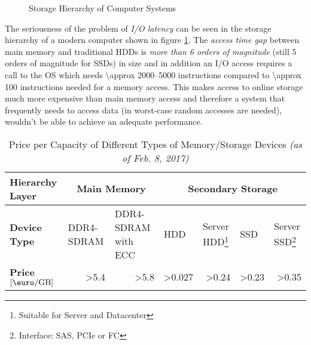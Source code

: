 \begin{@empty}
\begin{figure}[ht!]
\begin{minipage}{\linewidth}
{
		}
		\end{minipage}
		\caption{Storage Hierarchy of Computer Systems} \label{fig:storagehierarchy}
		\protect
	\end{figure}
\end{@empty}
	
	The seriousness of the problem of \emph{I/O latency} can be seen in the storage hierarchy of a modern computer shown in figure \ref{fig:storagehierarchy}. The \emph{access time gap} between main memory and traditional HDDs is \emph{more than 6 orders of magnitude} (still 5 orders of magnitude for SSDs) in size and in addition an I/O access requires a call to the OS which needs \numrange{\approx 2000}{5000} instructions compared to \num{\approx 100} instructions needed for a memory access. This makes access to online storage much more expensive than main memory access and therefore a system that frequently needs to access data (in worst-case random accesses are needed), wouldn't be able to achieve an adequate performance.
	
\begin{@empty}
	\begin{table}[h]
		\caption{Price per Capacity of Different Types of Memory/Storage Devices \textit{(as of Feb. 8, 2017)} \cite{heisehardware}} \label{tab:memorystorageprices}
		\centering
		\begin{minipage}{\linewidth}
			\footnotesize
			\begin{tabular}{|m{}|m{}|m{}|m{.09\textwidth}|m{}|m{}|m{}|}
				\hline
				\textbf{Hierarchy Layer} 							& \multicolumn{2}{c|}{\textbf{Main Memory}}							& \multicolumn{4}{c|}{\textbf{Secondary Storage}}	\\ \hline
				\textbf{Device Type}     							& \centering DDR4-SDRAM		& \centering DDR4-SDRAM with ECC		& \centering HDD																													& \centering Server HDD\footnote{Suitable for Server and Datacenter}		& \centering SSD					& \centering Server SSD\footnote{Interface: SAS, PCIe or FC}	\\ \hline
				\textbf{Price $\left[\si{\euro\per\giga\byte}\right]$}    	& \multicolumn{1}{r|}{\num{>5.4}}	& \multicolumn{1}{r|}{\num{>5.8}}		& \multicolumn{1}{r|}{\num{>0.027}}																								& \multicolumn{1}{r|}{\num{>0.24}}						& \multicolumn{1}{r|}{\num{>0.23}}	& \multicolumn{1}{r|}{\num{>0.35}}	\\ \hline
			\end{tabular}
		\end{minipage}
	\end{table}
\end{@empty}
	
